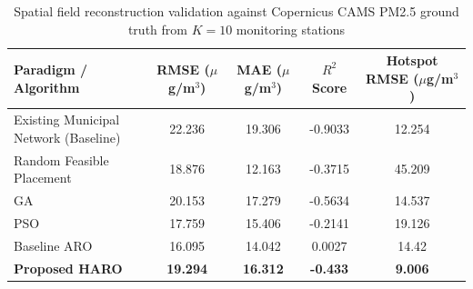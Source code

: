 \begin{table}[htbp]
\centering
\caption{Spatial field reconstruction validation against Copernicus CAMS PM2.5 ground truth from $K=10$ monitoring stations}
\label{tab:spatial_reconstruction_rmse}
\begin{tabular}{lcccc}
\hline
\textbf{Paradigm / Algorithm} & \textbf{RMSE ($\mu$g/m$^3$)} & \textbf{MAE ($\mu$g/m$^3$)} & \textbf{$R^2$ Score} & \textbf{Hotspot RMSE ($\mu$g/m$^3$)} \\
\hline
Existing Municipal Network (Baseline) & 22.236 & 19.306 & -0.9033 & 12.254 \\
Random Feasible Placement & 18.876 & 12.163 & -0.3715 & 45.209 \\
GA & 20.153 & 17.279 & -0.5634 & 14.537 \\
PSO & 17.759 & 15.406 & -0.2141 & 19.126 \\
Baseline ARO & 16.095 & 14.042 & 0.0027 & 14.42 \\
\textbf{Proposed HARO} & \textbf{19.294} & \textbf{16.312} & \textbf{-0.433} & \textbf{9.006} \\
\hline
\end{tabular}
\end{table}
